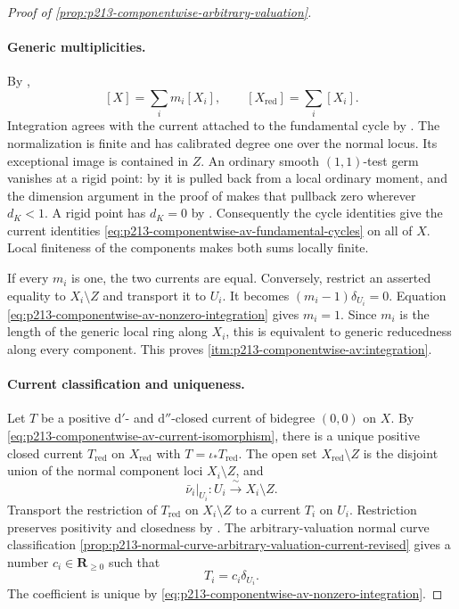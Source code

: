 \begin{proof}[Proof of
\cref{prop:p213-componentwise-arbitrary-valuation}]
\paragraph{Generic multiplicities.}
By \cite[Definition~13.2.5 and \S13.5.2]{CLD25},
\[
                   [X]=\sum_i m_i[X_i],
 \qquad
                   [X_{\mathrm{red}}]=\sum_i[X_i].
\]
Integration agrees with the current attached to the fundamental cycle by
\cite[Proposition~16.6.3]{CLD25}.  The normalization is finite and has
calibrated degree one over the normal locus.  Its exceptional image is
contained in $Z$.  An ordinary smooth $(1,1)$-test germ vanishes at a rigid
point: by \cite[Proposition~15.1.1(b)]{CLD25} it is pulled back from a
local ordinary moment, and the dimension argument in the proof of
\cite[Proposition~15.2.1(a)]{CLD25} makes that pullback zero wherever
$d_K<1$.  A rigid point has $d_K=0$ by \cite[(11.2.3.1)]{CLD25}.
Consequently the cycle identities give the current identities
\eqref{eq:p213-componentwise-av-fundamental-cycles} on all of $X$.
Local finiteness of the components makes both sums locally finite.

If every $m_i$ is one, the two currents are equal.  Conversely, restrict an
asserted equality to $X_i\setminus Z$ and transport it to $U_i$.  It becomes
$(m_i-1)\delta_{U_i}=0$.  Equation
\eqref{eq:p213-componentwise-av-nonzero-integration} gives $m_i=1$.
Since $m_i$ is the length of the generic local ring along $X_i$, this is
equivalent to generic reducedness along every component.  This proves
\cref{itm:p213-componentwise-av:integration}.

\paragraph{Current classification and uniqueness.}
Let $T$ be a positive $\mathrm d'$- and $\mathrm d''$-closed current of
bidegree $(0,0)$ on $X$.  By
\eqref{eq:p213-componentwise-av-current-isomorphism}, there is a unique
positive closed current $T_{\mathrm{red}}$ on $X_{\mathrm{red}}$ with
$T=\iota_*T_{\mathrm{red}}$.  The open set
$X_{\mathrm{red}}\setminus Z$ is the disjoint union of the normal component
loci $X_i\setminus Z$, and
\[
 \bar\nu_i|_{U_i}:U_i\xrightarrow{\ \sim\ }X_i\setminus Z.
\]
Transport the restriction of $T_{\mathrm{red}}$ on $X_i\setminus Z$ to a
current $T_i$ on $U_i$.  Restriction preserves positivity and closedness by
\cite[\S7.1.6 and \S\S7.7.1--7.7.3]{CLD25}.  The arbitrary-valuation normal
curve classification
\cref{prop:p213-normal-curve-arbitrary-valuation-current-revised} gives a number
$c_i\in\mathbf R_{\geq0}$ such that
\begin{equation}
 \label{eq:p213-componentwise-av-classification-off-Z}
                            T_i=c_i\delta_{U_i}.
\end{equation}
The coefficient is unique by
\eqref{eq:p213-componentwise-av-nonzero-integration}.


\end{proof}

